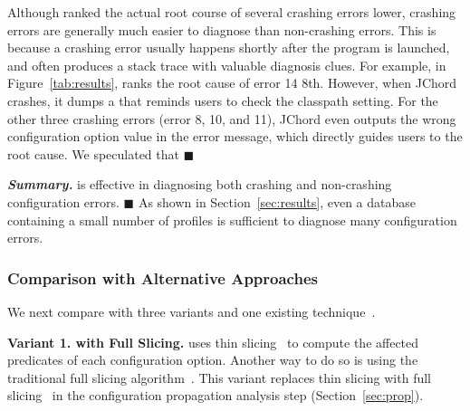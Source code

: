 Although \ourtool ranked the actual root course of several
crashing errors lower, crashing errors are generally much easier to diagnose than non-crashing errors.
This is because a crashing error usually happens shortly after the program
is launched, and often produces a stack trace with valuable diagnosis clues.
For example, in Figure~\ref{tab:results}, \ourtool ranks the root cause of
error 14  8th.
However, when JChord crashes, it dumps a 
that reminds users to check the classpath setting. For the other three crashing errors (error 8, 10, and 11),
JChord even outputs the wrong configuration option value in the
error message, which
directly guides users to the root cause. We speculated that $\blacksquare$








\vspace{1mm}
\noindent \textbf{\textit{Summary.}} \ourtool is effective
in diagnosing both crashing and non-crashing configuration errors. $\blacksquare$
As shown
in Section~\ref{sec:results}, even a database containing
a small number of profiles is sufficient to
diagnose many configuration errors.

\subsubsection{Comparison with Alternative Approaches}
\label{sec:comparison}

We next compare \ourtool with three variants and
one existing technique~\cite{Rabkin:2011:PPC}.

\vspace{1mm}
\noindent \textbf{Variant 1. \ourtool with Full Slicing.} 
\ourtool uses thin slicing~\cite{Sridharan:2007} to compute the affected predicates
of each configuration option. Another way to do so is
using the traditional full slicing algorithm~\cite{Horwitz:1988}.
This variant replaces thin slicing with 
full slicing~\cite{Horwitz:1988} in the configuration
propagation analysis step (Section~\ref{sec:prop}).

